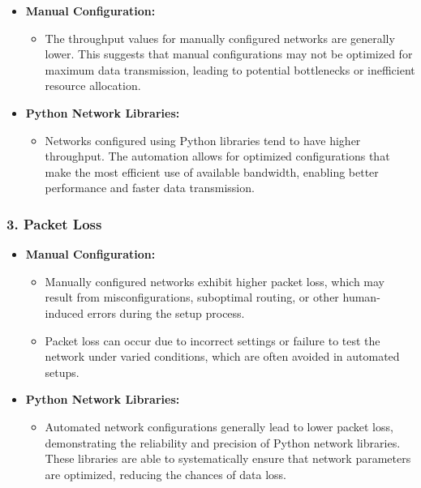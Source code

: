 \documentclass[11pt]{article}
\providecommand{\tightlist}{%
      \setlength{\itemsep}{0pt}\setlength{\parskip}{0pt}}
\begin{document}
\begin{itemize}
\tightlist
\item
  \textbf{Manual Configuration:}

  \begin{itemize}
  \tightlist
  \item
    The throughput values for manually configured networks are generally
    lower. This suggests that manual configurations may not be optimized
    for maximum data transmission, leading to potential bottlenecks or
    inefficient resource allocation.
  \end{itemize}
\item
  \textbf{Python Network Libraries:}

  \begin{itemize}
  \tightlist
  \item
    Networks configured using Python libraries tend to have higher
    throughput. The automation allows for optimized configurations that
    make the most efficient use of available bandwidth, enabling better
    performance and faster data transmission.
  \end{itemize}
\end{itemize}

\hypertarget{packet-loss}{%
\subsubsection{\texorpdfstring{3. \textbf{Packet
Loss}}{3. Packet Loss}}\label{packet-loss}}

\begin{itemize}
\tightlist
\item
  \textbf{Manual Configuration:}

  \begin{itemize}
  \tightlist
  \item
    Manually configured networks exhibit higher packet loss, which may
    result from misconfigurations, suboptimal routing, or other
    human-induced errors during the setup process.
  \item
    Packet loss can occur due to incorrect settings or failure to test
    the network under varied conditions, which are often avoided in
    automated setups.
  \end{itemize}
\item
  \textbf{Python Network Libraries:}

  \begin{itemize}
  \tightlist
  \item
    Automated network configurations generally lead to lower packet
    loss, demonstrating the reliability and precision of Python network
    libraries. These libraries are able to systematically ensure that
    network parameters are optimized, reducing the chances of data loss.
  \end{itemize}
\end{itemize}
\end{document}
